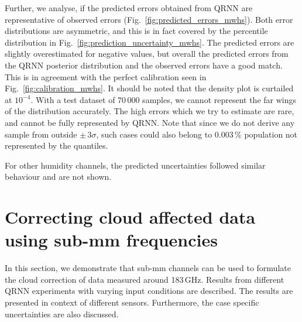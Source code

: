 \documentclass[amt, manuscript]{copernicus}
\begin{document}
Further, we analyse, if the  predicted errors obtained from QRNN are representative of observed errors (Fig.~\ref{fig:predicted_errors_mwhs}). Both error distributions are asymmetric, and this is in fact covered by the percentile distribution  in Fig.~\ref{fig:prediction_uncertainty_mwhs}. The predicted errors are slightly overestimated for negative values, but overall the predicted errors from the QRNN posterior distribution and the observed errors have a good match. This is in agreement with the perfect calibration seen in Fig.~\ref{fig:calibration_mwhs}. It should be noted that the density plot is curtailed at $10^{-4}$. With a test dataset of 70\,000 samples, we cannot represent the far wings of the distribution accurately. The high errors which we try to estimate are rare, and cannot be fully represented by QRNN. Note that since we do not derive any sample from outside $\pm\,3\sigma$, such cases could also belong to 0.003\,\% population not represented by the quantiles.   

For other humidity channels, the predicted uncertainties followed similar behaviour and are not shown. 


\section{Correcting cloud affected data using sub-mm frequencies}
\label{qrnn_ici}
In this section, we demonstrate that sub-mm channels can be used to formulate the cloud correction of data measured around 183\,GHz. Results from different QRNN experiments with varying input conditions are described. The results are presented in context of different sensors. Furthermore, the case specific uncertainties are also discussed.
\end{document}
